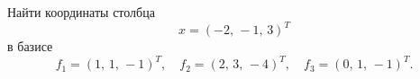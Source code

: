 Найти координаты столбца
\[
	x = (-2,\,-1,\,3)^{T}
\]
в базисе
\[
	f_{1} = (1,\,1,\,-1)^{T},\quad
	f_{2} = (2,\,3,\,-4)^{T},\quad
	f_{3} = (0,\,1,\,-1)^{T}.
\]